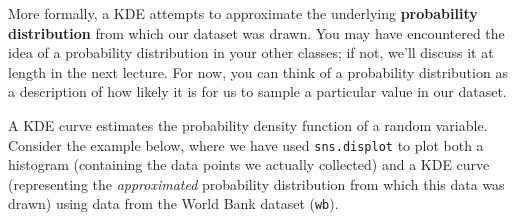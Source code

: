 \documentclass[
  letterpaper,
  DIV=11,
  numbers=noendperiod]{scrreprt}
\newenvironment{Shaded}{\begin{snugshade}}{\end{snugshade}}
\newcommand{\DecValTok}[1]{\textcolor[rgb]{0.68,0.00,0.00}{#1}}
\newcommand{\ImportTok}[1]{\textcolor[rgb]{0.00,0.46,0.62}{#1}}
\newcommand{\NormalTok}[1]{\textcolor[rgb]{0.00,0.23,0.31}{#1}}
\newcommand{\OperatorTok}[1]{\textcolor[rgb]{0.37,0.37,0.37}{#1}}
\newcommand{\SpecialCharTok}[1]{\textcolor[rgb]{0.37,0.37,0.37}{#1}}
\newcommand{\StringTok}[1]{\textcolor[rgb]{0.13,0.47,0.30}{#1}}
\begin{document}
More formally, a KDE attempts to approximate the underlying
\textbf{probability distribution} from which our dataset was drawn. You
may have encountered the idea of a probability distribution in your
other classes; if not, we'll discuss it at length in the next lecture.
For now, you can think of a probability distribution as a description of
how likely it is for us to sample a particular value in our dataset.

A KDE curve estimates the probability density function of a random
variable. Consider the example below, where we have used
\texttt{sns.displot} to plot both a histogram (containing the data
points we actually collected) and a KDE curve (representing the
\emph{approximated} probability distribution from which this data was
drawn) using data from the World Bank dataset (\texttt{wb}).

\begin{Shaded}
\end{Shaded}
\end{document}
